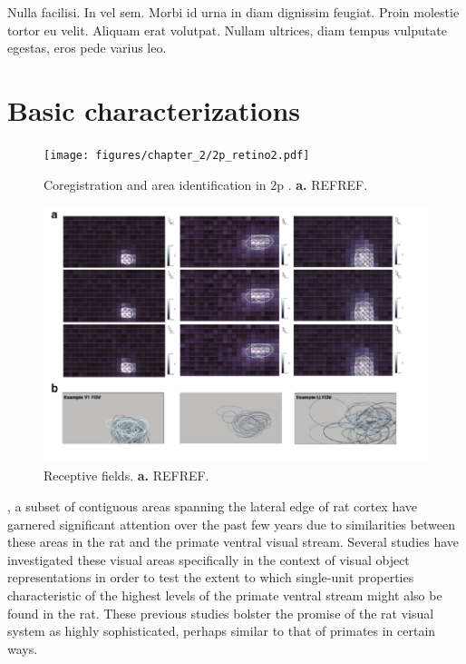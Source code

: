 \begin{savequote}[75mm]
Nulla facilisi. In vel sem. Morbi id urna in diam dignissim feugiat. Proin molestie tortor eu velit. Aliquam erat volutpat. Nullam ultrices, diam tempus vulputate egestas, eros pede varius leo.
\end{savequote}

\chapter{Basic characterizations}

\begin{figure}
    \texttt{[image: figures/chapter\_2/2p\_retino2.pdf]}
    \vspace{.1in}
    \caption[Coregistration and area identification in 2p]{Coregistration and area identification in 2p . \textbf{a.} REFREF.
    \label{fig:2p_retino}}
\end{figure}

\begin{figure}[t!]
    \includegraphics[width=\textwidth]{figures/chapter_3/receptive_fields.pdf}
    \vspace{.1in}
    \caption[Receptive fields]{Receptive fields. \textbf{a.} REFREF.
    \label{fig:receptive_fields}}
\end{figure}
 
, a subset of contiguous areas spanning the lateral edge of rat cortex have garnered significant attention over the past few years due to similarities between these areas in the rat and the primate ventral visual stream. Several studies \cite{Vermaercke2014, Tafazoli2017, Vinken2016NeuralCortex} have investigated these visual areas specifically in the context of visual object representations in order to test the extent to which single-unit properties characteristic of the highest levels of the primate ventral stream might also be found in the rat. These previous studies bolster the promise of the rat visual system as highly sophisticated, perhaps similar to that of primates in certain ways. 


